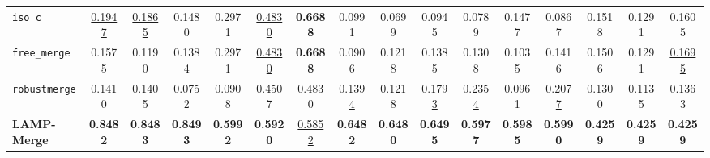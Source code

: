 \begin{table}[t]
\begin{tabular}{lccccccccccccccc}
\texttt{iso\_c} & \underline{0.1947} & \underline{0.1865} & 0.1480 & 0.2971 & \underline{0.4830} & \textbf{0.6688} & 0.0991 & 0.0699 & 0.0945 & 0.0789 & 0.1477 & 0.0867 & 0.1518 & 0.1291 & 0.1605 \\
\texttt{free\_merge} & 0.1575 & 0.1190 & 0.1384 & 0.2971 & \underline{0.4830} & \textbf{0.6688} & 0.0906 & 0.1218 & 0.1385 & 0.1308 & 0.1035 & 0.1416 & 0.1506 & 0.1291 & \underline{0.1695} \\
\texttt{robustmerge} & 0.1410 & 0.1405 & 0.0752 & 0.0908 & 0.4507 & 0.4830 & \underline{0.1394} & 0.1218 & \underline{0.1793} & \underline{0.2354} & 0.0961 & \underline{0.2077} & 0.1300 & 0.1135 & 0.1363 \\
\textbf{LAMP-Merge} & \textbf{0.8482} & \textbf{0.8483} & \textbf{0.8493} & \textbf{0.5992} & \textbf{0.5920} & \underline{0.5852} & \textbf{0.6482} & \textbf{0.6480} & \textbf{0.6495} & \textbf{0.5977} & \textbf{0.5985} & \textbf{0.5990} & \textbf{0.4259} & \textbf{0.4259} & \textbf{0.4259} \\
\bottomrule
\end{tabular}
\end{table}

